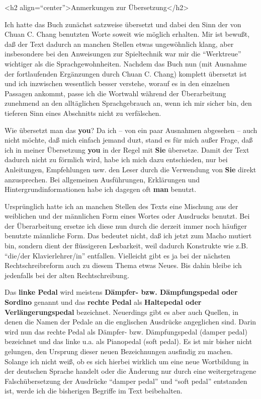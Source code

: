 
\label{ueberset}

<h2 align=\enquote{center}>Anmerkungen zur Übersetzung</h2>

Ich hatte das Buch zunächst satzweise übersetzt und dabei den Sinn der von Chuan C. Chang benutzten Worte soweit wie möglich erhalten.
Mir ist bewußt, daß der Text dadurch an manchen Stellen etwas ungewöhnlich klang, aber insbesondere bei den Anweisungen zur Spieltechnik war mir die \enquote{Werktreue} wichtiger als die Sprachgewohnheiten.
Nachdem das Buch nun (mit Ausnahme der fortlaufenden Ergänzungen durch Chuan C. Chang) komplett übersetzt ist und ich inzwischen wesentlich besser verstehe, worauf es in den einzelnen Passagen ankommt, passe ich die Wortwahl während der Überarbeitung zunehmend an den alltäglichen Sprachgebrauch an, wenn ich mir sicher bin, den tieferen Sinn eines Abschnitts nicht zu verfälschen.

Wie übersetzt man das \textbf{you}?
 Da ich -- von ein paar Ausnahmen abgesehen -- auch nicht möchte, daß mich einfach jemand duzt, stand es für mich außer Frage, daß ich in meiner Übersetzung \textbf{you} in der Regel mit \textbf{Sie} übersetze.
Damit der Text dadurch nicht zu förmlich wird, habe ich mich dazu entschieden, nur bei Anleitungen, Empfehlungen usw.
den Leser durch die Verwendung von \textbf{Sie} direkt anzusprechen.
Bei allgemeinen Ausführungen, Erklärungen und Hintergrundinformationen habe ich dagegen oft \textbf{man} benutzt.


Ursprünglich hatte ich an manchen Stellen des Texts eine Mischung aus der weiblichen und der männlichen Form eines Wortes oder Ausdrucks benutzt.
Bei der Überarbeitung ersetze ich diese nun durch die derzeit immer noch häufiger benutzte männliche Form.
Das bedeutet nicht, daß ich jetzt zum Macho mutiert bin, sondern dient der flüssigeren Lesbarkeit, weil dadurch Konstrukte wie z.B. \enquote{die/der Klavierlehrer/in} entfallen.
Vielleicht gibt es ja bei der nächsten Rechtschreibreform auch zu diesem Thema etwas Neues.
Bis dahin bleibe ich jedenfalls bei der alten Rechtschreibung.


\label{Pedale}

Das \textbf{linke Pedal} wird meistens \textbf{Dämpfer- bzw. Dämpfungspedal oder Sordino} genannt und das \textbf{rechte Pedal} als \textbf{Haltepedal oder Verlängerungspedal} bezeichnet.
Neuerdings gibt es aber auch Quellen, in denen die Namen der Pedale an die englischen Ausdrücke angeglichen sind.
Darin wird nun das rechte Pedal als Dämpfer- bzw. Dämpfungspedal (damper pedal) bezeichnet und das linke u.a. als Pianopedal (soft pedal).
Es ist mir bisher nicht gelungen, den Ursprung dieser neuen Bezeichnungen ausfindig zu machen.
Solange ich nicht weiß, ob es sich hierbei wirklich um eine neue Wortbildung in der deutschen Sprache handelt oder die Änderung nur durch eine weitergetragene Falschübersetzung der Ausdrücke \enquote{damper pedal} und \enquote{soft pedal} entstanden ist, werde ich die bisherigen Begriffe im Text beibehalten.

